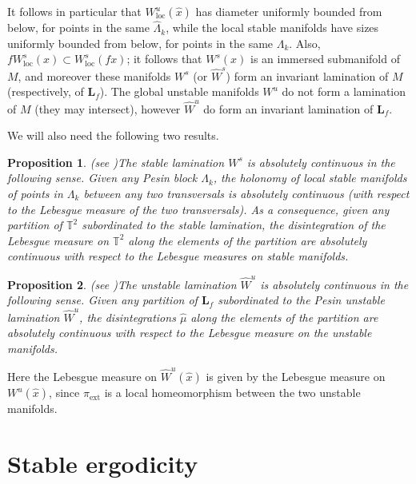 \documentclass[11pt,letterpaper,reqno]{article}
\newtheorem{proposition}{Proposition}[section]
\newcommand{\TT}{\mathbb{T}^2}
\newcommand{\hTTf}[1][f]{\mathbf{L}_{#1}}
\newcommand{\hmu}{\hat{\mu}}
\newcommand{\hx}[1][x]{\hat{#1}}
\newcommand{\pext}{\pi_{\mathrm{ext}}}
\newcommand{\Wuloc}[1]{W^{u}_{\mathrm{loc}}(#1)}
\newcommand{\Wsloc}[1]{W^{s}_{\mathrm{loc}}(#1)}
\begin{document}
It follows in particular that $\Wuloc{\hx}$ has diameter uniformly bounded from below, for points in the same $\hat\Lambda_k$, while the local stable manifolds have sizes uniformly bounded from below, for points in the same $\Lambda_k$. Also, $f\Wsloc{x}\subset\Wsloc{fx}$; it follows that $W^s(x)$ is an immersed submanifold of $M$, and moreover these  manifolds $W^s$ (or $\hat{W}^s$) form an invariant lamination of $M$ (respectively, of $\hTTf$). The global unstable manifolds $W^u$ do not form a lamination of $M$ (they may intersect), however $\hat{W}^u$ do form an invariant lamination of $\hTTf$.


\smallskip 
 


We will also need the following two results.


\begin{proposition}(see \cite{Liu2008})\label{pro:sabscont}
The stable lamination $W^s$ is absolutely continuous in the following sense. Given any Pesin block $\Lambda_k$, the holonomy of local stable manifolds of points in $\Lambda_k$ between any two transversals is absolutely continuous (with respect to the Lebesgue measure of the two transversals). As a consequence, given any partition of $\TT$ subordinated to the stable lamination, the disintegration of the Lebesgue measure on $\TT$ along the elements of the partition are absolutely continuous with respect to the Lebesgue measures on stable manifolds.

\end{proposition}

\begin{proposition}(see \cite{Liu2011})\label{pro:abscontWu}
The unstable lamination $\hat W^u$ is absolutely continuous in the following sense. Given any partition of $\hTTf$ subordinated to the Pesin unstable lamination $\hat W^u$, the disintegrations $\hmu$ along the elements of the partition are absolutely continuous with respect to the Lebesgue measure on the unstable manifolds.
\end{proposition}

Here the Lebesgue measure on $\hat W^u(\hx)$ is given by the Lebesgue measure on $W^u(\hx)$, since $\pext$ is a local homeomorphism between the two unstable manifolds.



\section{Stable ergodicity}
\end{document}
